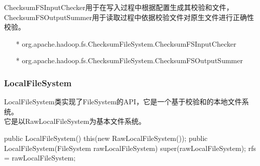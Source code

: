         ChecksumFSInputChecker用于在写入过程中根据配置生成其校验和文件，ChecksumFSOutputSummer用于读取过程中依据校验文件对原生文件进行正确性校验。
        \begin{itemize}
            \item[*] org.apache.hadoop.fs.ChecksumFileSystem.ChecksumFSInputChecker      
            \item[*] org.apache.hadoop.fs.ChecksumFileSystem.ChecksumFSOutputSummer
        \end{itemize}

    \subsubsection{LocalFileSystem}
        LocalFileSystem类实现了FileSystem的API，它是一个基于校验和的本地文件系统。\\
        它是以RawLocalFileSystem为基本文件系统。
        \begin{java}[caption=LocalFileSystem]
public LocalFileSystem() {  
    this(new RawLocalFileSystem());  
}  
public LocalFileSystem(FileSystem rawLocalFileSystem) {  
    super(rawLocalFileSystem);  
    rfs = rawLocalFileSystem;  
} 
        \end{java}
        

